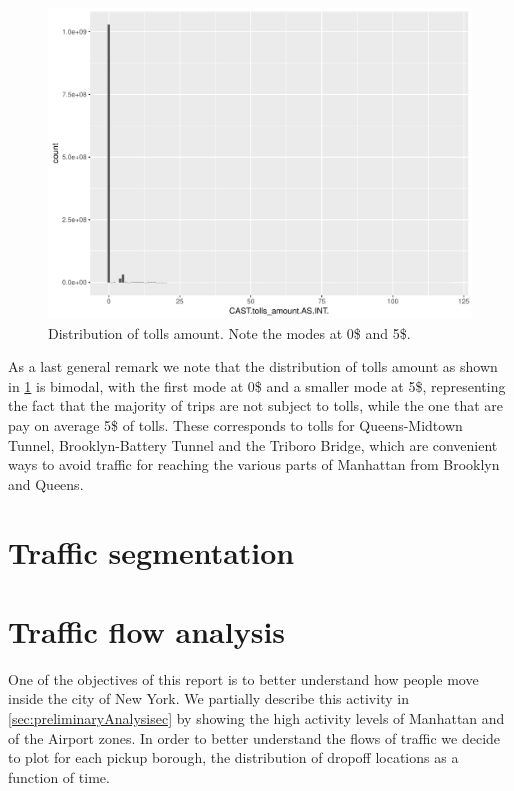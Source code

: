 \documentclass{acm_proc_article-sp-sigmod09}
\begin{document}
\begin{figure}
	\centering
	\includegraphics[width=1\columnwidth]{resources/base_plots/tolls_amount_distr.pdf}
	\caption{Distribution of tolls amount. Note the modes at 0\$ and 5\$.}
	\label{fig:tollsAmountDistr}
\end{figure}

As a last general remark we note that the distribution of tolls amount as shown in \cref{fig:tollsAmountDistr} is bimodal, with the first mode at 0\$ and a smaller mode at 5\$, representing the fact that the majority of trips are not subject to tolls, while the one that are pay on average 5\$ of tolls. These corresponds to tolls for Queens-Midtown Tunnel, Brooklyn-Battery Tunnel and the Triboro Bridge, which are convenient ways to avoid traffic for reaching the various parts of Manhattan from Brooklyn and Queens.

\section{Traffic segmentation}

\section{Traffic flow analysis}

One of the objectives of this report is to better understand how people move inside the city of New York. We partially describe this activity in \cref{sec:preliminaryAnalysisec} by showing the high activity levels of Manhattan and of the Airport zones. In order to better understand the flows of traffic we decide to plot for each pickup borough, the distribution of dropoff locations as a function of time.
\end{document}
